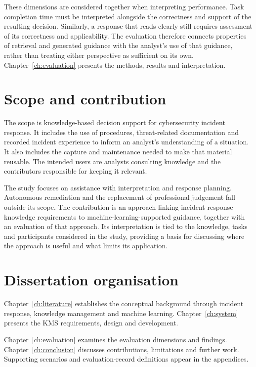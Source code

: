 These dimensions are considered together when interpreting performance. Task completion time must be interpreted alongside the correctness and support of the resulting decision. Similarly, a response that reads clearly still requires assessment of its correctness and applicability. The evaluation therefore connects properties of retrieval and generated guidance with the analyst's use of that guidance, rather than treating either perspective as sufficient on its own. Chapter~\ref{ch:evaluation} presents the methods, results and interpretation.

\section{Scope and contribution}
The scope is knowledge-based decision support for cybersecurity incident response. It includes the use of procedures, threat-related documentation and recorded incident experience to inform an analyst's understanding of a situation. It also includes the capture and maintenance needed to make that material reusable. The intended users are analysts consulting knowledge and the contributors responsible for keeping it relevant.

The study focuses on assistance with interpretation and response planning. Autonomous remediation and the replacement of professional judgement fall outside its scope. The contribution is an approach linking incident-response knowledge requirements to machine-learning-supported guidance, together with an evaluation of that approach. Its interpretation is tied to the knowledge, tasks and participants considered in the study, providing a basis for discussing where the approach is useful and what limits its application.

\section{Dissertation organisation}
Chapter~\ref{ch:literature} establishes the conceptual background through incident response, knowledge management and machine learning. Chapter~\ref{ch:system} presents the KMS requirements, design and development.

Chapter~\ref{ch:evaluation} examines the evaluation dimensions and findings. Chapter~\ref{ch:conclusion} discusses contributions, limitations and further work. Supporting scenarios and evaluation-record definitions appear in the appendices.

